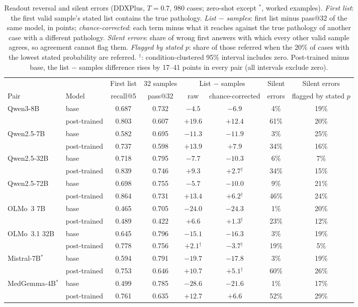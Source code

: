 \documentclass[wcp]{jmlr}
\begin{document}
\begin{table}[t]
\centering\small
\setlength{\tabcolsep}{3.5pt}
\begin{adjustbox}{max width=\linewidth}
\begin{tabular}{llcccccc}
\toprule
 & & First list & 32 samples & \multicolumn{2}{c}{List $-$ samples} & Silent & Silent errors \\
Pair & Model & recall@5 & pass@32 & raw & chance-corrected & errors & flagged by stated $p$ \\
\midrule
Qwen3-8B & base & 0.687 & 0.732 & $-4.5$ & $-6.9$ & 4\% & 19\% \\
 & post-trained & 0.803 & 0.607 & $+19.6$ & $+12.4$ & 61\% & 20\% \\
Qwen2.5-7B & base & 0.582 & 0.695 & $-11.3$ & $-11.9$ & 3\% & 25\% \\
 & post-trained & 0.737 & 0.598 & $+13.9$ & $+7.9$ & 34\% & 16\% \\
Qwen2.5-32B & base & 0.718 & 0.795 & $-7.7$ & $-10.3$ & 6\% & 7\% \\
 & post-trained & 0.839 & 0.746 & $+9.3$ & $+2.7$$^{\dagger}$ & 34\% & 15\% \\
Qwen2.5-72B & base & 0.698 & 0.755 & $-5.7$ & $-10.0$ & 9\% & 21\% \\
 & post-trained & 0.864 & 0.731 & $+13.4$ & $+6.2$$^{\dagger}$ & 46\% & 24\% \\
OLMo~3 7B & base & 0.465 & 0.705 & $-24.0$ & $-24.3$ & 1\% & 20\% \\
 & post-trained & 0.489 & 0.422 & $+6.6$ & $+1.3$$^{\dagger}$ & 23\% & 12\% \\
OLMo~3.1 32B & base & 0.645 & 0.796 & $-15.1$ & $-16.3$ & 3\% & 19\% \\
 & post-trained & 0.778 & 0.756 & $+2.1$$^{\dagger}$ & $-3.7$$^{\dagger}$ & 19\% & 5\% \\
Mistral-7B$^{*}$ & base & 0.594 & 0.791 & $-19.7$ & $-17.8$ & 3\% & 19\% \\
 & post-trained & 0.753 & 0.646 & $+10.7$ & $+5.1$$^{\dagger}$ & 60\% & 26\% \\
MedGemma-4B$^{*}$ & base & 0.499 & 0.785 & $-28.6$ & $-21.6$ & 1\% & 17\% \\
 & post-trained & 0.761 & 0.635 & $+12.7$ & $+6.6$ & 52\% & 29\% \\
\bottomrule
\end{tabular}
\end{adjustbox}
\caption{Readout reversal and silent errors (DDXPlus, $T{=}0.7$, 980 cases; zero-shot except $^{*}$, worked examples). \emph{First list}: the first valid sample's stated list contains the true pathology. \emph{List $-$ samples}: first list minus pass@32 of the same model, in points; \emph{chance-corrected}: each term minus what it reaches against the true pathology of another case with a different pathology. \emph{Silent errors}: share of wrong first answers with which every other valid sample agrees, so agreement cannot flag them. \emph{Flagged by stated $p$}: share of those referred when the 20\% of cases with the lowest stated probability are referred. $^{\dagger}$: condition-clustered 95\% interval includes zero. Post-trained minus base, the list $-$ samples difference rises by 17--41 points in every pair (all intervals exclude zero).}

\end{table}
\end{document}
